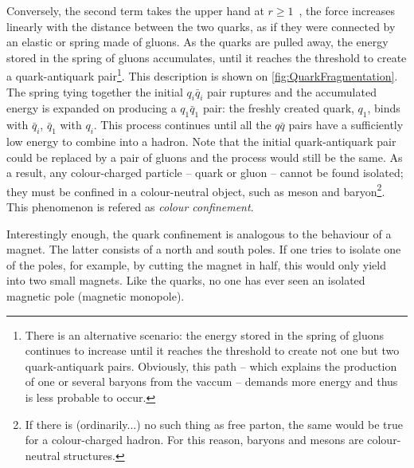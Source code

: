 Conversely, the second term takes the upper hand at $r \geq 1$~\fm, the force increases linearly with the distance between the two quarks, as if they were connected by an elastic or spring made of gluons. As the quarks are pulled away, the energy stored in the spring of gluons accumulates, until it reaches the threshold to create a quark-antiquark pair\footnote{There is an alternative scenario: the energy stored in the spring of gluons continues to increase until it reaches the threshold to create not one but two quark-antiquark pairs. Obviously, this path -- which explains the production of one or several baryons from the vaccum -- demands more energy and thus is less probable to occur.}. This description is shown on \fig\ref{fig:QuarkFragmentation}. The spring tying together the initial $q_{i}\bar{q}_{i}$ pair ruptures and the accumulated energy is expanded on producing a $q_{1}\bar{q}_{1}$ pair: the freshly created quark, $q_{1}$, binds with $\bar{q}_{i}$,  $\bar{q}_{1}$ with $q_{i}$. This process continues until all the $q\bar{q}$ pairs have a sufficiently low energy to combine into a hadron. Note that the initial quark-antiquark pair could be replaced by a pair of gluons and the process would still be the same. As a result, any colour-charged particle -- quark or gluon -- cannot be found isolated; they must be confined in a colour-neutral object, such as meson and baryon\footnote{If there is (ordinarily...) no such thing as free parton, the same would be true for a colour-charged hadron. For this reason, baryons and mesons are colour-neutral structures.}. This phenomenon is refered as \textit{colour confinement}.


Interestingly enough, the quark confinement is analogous to the behaviour of a magnet. The latter consists of a north and south poles. If one tries to isolate one of the poles, for example, by cutting the magnet in half, this would only yield into two small magnets. Like the quarks, no one has ever seen an isolated magnetic pole (magnetic monopole).

